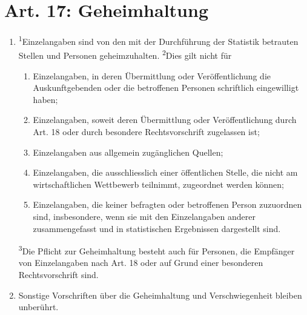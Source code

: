     \section{Art. 17: Geheimhaltung}
        \begin{enumerate}[label=(\arabic*)]
            \item \textsuperscript{1}Einzelangaben sind von den mit der Durchführung der Statistik betrauten Stellen und Personen geheimzuhalten. \textsuperscript{2}Dies gilt nicht für
                \begin{enumerate}[label=\arabic*.]
                    \item Einzelangaben, in deren Übermittlung oder Veröffentlichung die Auskunftgebenden oder die betroffenen Personen schriftlich eingewilligt haben;
                    \item Einzelangaben, soweit deren Übermittlung oder Veröffentlichung durch Art. 18 oder durch besondere Rechtsvorschrift zugelassen ist;
                    \item Einzelangaben aus allgemein zugänglichen Quellen;
                    \item Einzelangaben, die ausschliesslich einer öffentlichen Stelle, die nicht am wirtschaftlichen Wettbewerb teilnimmt, zugeordnet werden können;
                    \item Einzelangaben, die keiner befragten oder betroffenen Person zuzuordnen sind, insbesondere, wenn sie mit den Einzelangaben anderer zusammengefasst und in statistischen Ergebnissen dargestellt sind.
                \end{enumerate}
            \textsuperscript{3}Die Pflicht zur Geheimhaltung besteht auch für Personen, die Empfänger von Einzelangaben nach Art. 18 oder auf Grund einer besonderen Rechtsvorschrift sind.
            \item Sonstige Vorschriften über die Geheimhaltung und Verschwiegenheit bleiben unberührt.
        \end{enumerate}
